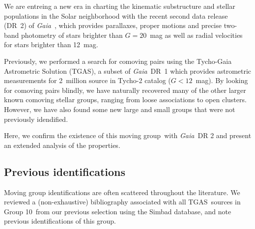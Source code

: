 \documentclass[modern,letterpaper]{aastex61}
\newcommand{\project}[1]{\textsl{#1}}
\newcommand{\acronym}[1]{{\small{#1}}}
\newcommand{\gaia}{\project{Gaia}}
\newcommand{\tgas}{\acronym{TGAS}}
\newcommand{\objname}{moving group}
\newcommand{\groupTen}{Group 10}
\begin{document}
We are entreing a new era in charting the kinematic substructure and stellar
populations in the Solar neighborhood with the recent second data release (DR~2)
of \gaia\ \citep{2018arXiv180409365G}, which provides parallaxes, proper motions
and precise two-band photometry of stars brighter than $G=20$~mag as well as
radial velocities for stars brighter than 12~mag.

Previously, we performed a search for comoving pairs using the Tycho-Gaia
Astrometric Solution (\tgas), a subset of \gaia\ DR~1 which provides astrometric
measurements for 2~million source in Tycho-2 catalog ($G<12$~mag).
By looking for comoving pairs blindly, we have naturally recovered
many of the other larger known comoving stellar groups, ranging from
loose associations to open clusters.
However, we have also found some new large and small groups that
were not previously idendified.


Here, we confirm the existence of this \objname\ with \gaia\ DR 2 and
present an extended analysis of the properties.




\subsection{Previous identifications}
\label{subsec:history}

Moving group identifications are often scattered throughout the literature. We
reviewed a (non-exhaustive) bibliography associated with all \tgas\ sources in
\groupTen\ from our previous selection \citep{2017AJ....153..257O} using the
Simbad database, and note previous identifications of this group.
\end{document}
